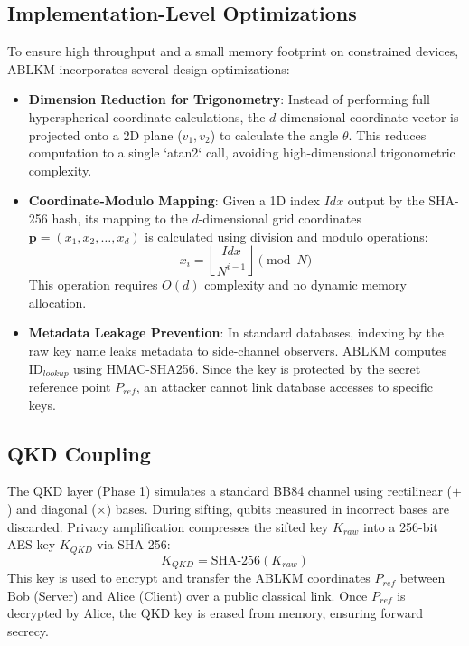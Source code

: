 \documentclass[conference,a4paper]{IEEEtran}
\begin{document}
\subsection{Implementation-Level Optimizations}
To ensure high throughput and a small memory footprint on constrained devices, ABLKM incorporates several design optimizations:
\begin{itemize}
    \item \textbf{Dimension Reduction for Trigonometry}: Instead of performing full hyperspherical coordinate calculations, the $d$-dimensional coordinate vector is projected onto a 2D plane ($v_1, v_2$) to calculate the angle $\theta$. This reduces computation to a single `atan2` call, avoiding high-dimensional trigonometric complexity.
    \item \textbf{Coordinate-Modulo Mapping}: Given a 1D index $Idx$ output by the SHA-256 hash, its mapping to the $d$-dimensional grid coordinates $\mathbf{p} = (x_1, x_2, \dots, x_d)$ is calculated using division and modulo operations:
    \begin{equation}
    x_i = \left\lfloor \frac{Idx}{N^{i-1}} \right\rfloor \pmod{N}
    \end{equation}
    This operation requires $O(d)$ complexity and no dynamic memory allocation.
    \item \textbf{Metadata Leakage Prevention}: In standard databases, indexing by the raw key name leaks metadata to side-channel observers. ABLKM computes $\text{ID}_{lookup}$ using HMAC-SHA256. Since the key is protected by the secret reference point $P_{ref}$, an attacker cannot link database accesses to specific keys.
\end{itemize}

\subsection{QKD Coupling}
The QKD layer (Phase 1) simulates a standard BB84 channel using rectilinear ($+$) and diagonal ($\times$) bases. During sifting, qubits measured in incorrect bases are discarded. Privacy amplification compresses the sifted key $K_{raw}$ into a 256-bit AES key $K_{QKD}$ via SHA-256:
\begin{equation}
K_{QKD} = \text{SHA-256}(K_{raw})
\end{equation}
This key is used to encrypt and transfer the ABLKM coordinates $P_{ref}$ between Bob (Server) and Alice (Client) over a public classical link. Once $P_{ref}$ is decrypted by Alice, the QKD key is erased from memory, ensuring forward secrecy.
\end{document}
